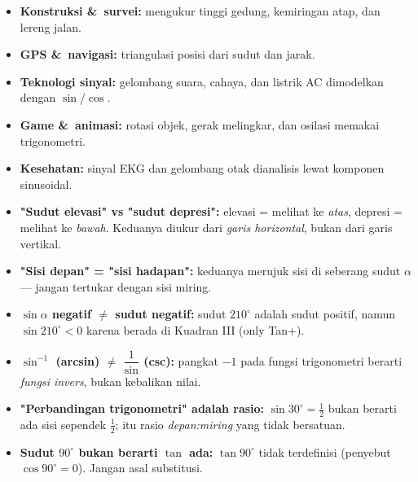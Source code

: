 \documentclass[11pt,a4paper]{report}
\theoremstyle{gaya}
\begin{document}
\begin{dunianyata}
\begin{itemize}[leftmargin=*,topsep=2pt]
  \item \textbf{Konstruksi \&\ survei:} mengukur tinggi gedung, kemiringan atap, dan lereng jalan.
  \item \textbf{GPS \&\ navigasi:} triangulasi posisi dari sudut dan jarak.
  \item \textbf{Teknologi sinyal:} gelombang suara, cahaya, dan listrik AC dimodelkan dengan $\sin$/$\cos$.
  \item \textbf{Game \&\ animasi:} rotasi objek, gerak melingkar, dan osilasi memakai trigonometri.
  \item \textbf{Kesehatan:} sinyal EKG dan gelombang otak dianalisis lewat komponen sinusoidal.
\end{itemize}
\end{dunianyata}

\begin{tcolorbox}[colback=oranyemuda,colframe=oranye,title=\textbf{Bahasa Alternatif yang Sering Mengecoh di Soal}]
\begin{itemize}[leftmargin=*,topsep=2pt]
  \item \textbf{"Sudut elevasi" vs "sudut depresi":} elevasi = melihat ke \emph{atas}, depresi = melihat ke \emph{bawah}. Keduanya diukur dari \emph{garis horizontal}, bukan dari garis vertikal.
  \item \textbf{"Sisi depan" = "sisi hadapan":} keduanya merujuk sisi di seberang sudut $\alpha$ --- jangan tertukar dengan sisi miring.
  \item \textbf{$\sin\alpha$ negatif $\ne$ sudut negatif:} sudut $210^\circ$ adalah sudut positif, namun $\sin210^\circ<0$ karena berada di Kuadran III (only Tan$+$).
  \item \textbf{$\sin^{-1}$ (arcsin) $\ne$ $\dfrac{1}{\sin}$ (csc):} pangkat $-1$ pada fungsi trigonometri berarti \emph{fungsi invers}, bukan kebalikan nilai.
  \item \textbf{"Perbandingan trigonometri" adalah rasio:} $\sin30^\circ=\tfrac12$ bukan berarti ada sisi sependek $\tfrac12$; itu rasio \emph{depan:miring} yang tidak bersatuan.
  \item \textbf{Sudut $90^\circ$ bukan berarti $\tan$ ada:} $\tan90^\circ$ tidak terdefinisi (penyebut $\cos90^\circ=0$). Jangan asal substitusi.
\end{itemize}
\end{tcolorbox}
\end{document}
